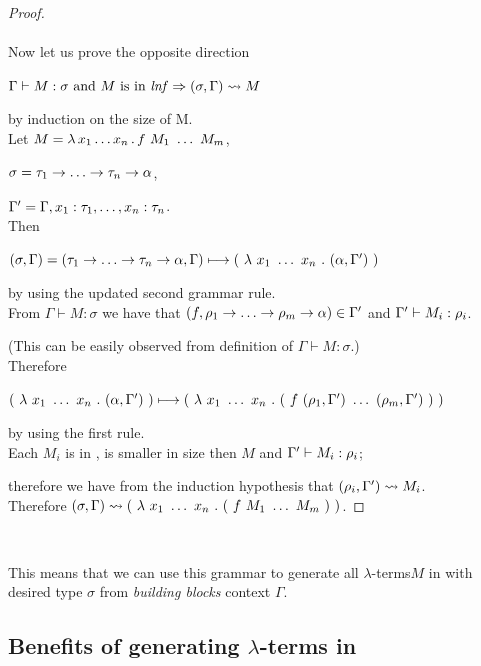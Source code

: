 \documentclass[12pt,a4paper]{report}
\newcommand{\lets}{let us\xspace}
\newcommand{\lterms}{$\lambda$-terms\xspace}
\newcommand{\tur}[3]{#1\vdash{}#2:#3}
\newcommand{\turst}[3]{$#1\vdash{}#2:#3$\xspace}
\newcommand{\GMS}{\turst{\Gamma}{M}{\sigma}}
\begin{document}
\begin{proof}
~\\~\\

Now \lets prove the opposite direction 

$\tur{\Gamma}{M}{\sigma} \text{ and $M$ is in \textit{lnf}}
\then
(\sigma,\Gamma) \garr M$
   
by induction on the size of M.\\


Let $M = \lambda \, x_1 \dots x_n \, . \, f~M_1~\dots~M_m$,

$\sigma = \tau_1 \ar \dots \ar \tau_n \ar \alpha$,

$\Gamma^\prime = \Gamma , x_1:\tau_1 , \dots , x_n:\tau_n$.\\

Then

$
( \sigma , \Gamma ) =
( \tau_1 \ar \dots \ar \tau_n \ar \alpha , \Gamma )  
\gar
(~\lambda~x_1~\dots~x_n~.~
( \alpha , \Gp )~)
$

by using the updated second grammar rule.\\

From \GMS we have that $(f,\rho_1\ar\dots\ar\rho_m\ar\alpha) \in \Gp$
and $\tur{\Gp}{M_i}{\rho_i}$.

(This can be easily observed from definition of \GMS.)\\

Therefore 

$
(~\lambda~x_1~\dots~x_n~.~( \alpha , \Gamma^\prime )~)
\longmapsto
(~\lambda~x_1~\dots~x_n~.~
	(~f~( \rho_1 , \Gamma^\prime )~\dots~( \rho_m , \Gamma^\prime )~)
~)
$

by using the first rule.\\

Each $M_i$ is in \lnf, 
is smaller in size then $M$
and $\tur{\Gp}{M_i}{\rho_i}$; 

therefore we have from the induction hypothesis that 
$(\rho_i,\Gamma^\prime) \leadsto M_i$.\\

Therefore 
$
( \sigma , \Gamma )
\leadsto
(~\lambda~x_1~\dots~x_n~.~
	(~f~M_1~\dots~M_m~)
~)
$.
 
\end{proof}~


This means that we can use this grammar to generate all \lterms $M$ in \lnf
with desired type $\sigma$ from \textit{building blocks} context $\Gamma$.\\



\subsection{Benefits of generating \lterms in \lnf}
\label{benefits}
\end{document}

